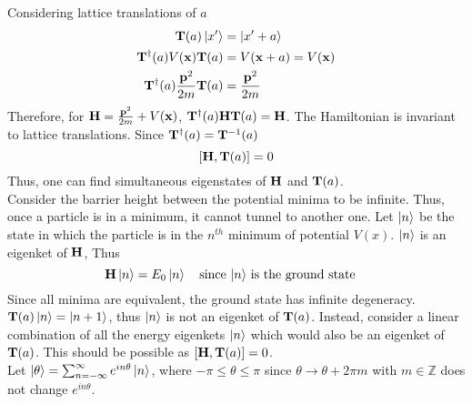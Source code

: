 \documentclass[12pt,a4paper,titlepage]{article}
\begin{document}
Considering lattice translations of $a$
\begin{equation}
\begin{aligned}
\vb{T}(a)\ket{x'}&=\ket{x'+a}\\
\vb{T}^{\dagger}(a)V(\vb{x})\vb{T}(a)&=V(\vb{x}+a)=V(\vb{x})\\
\vb{T}^{\dagger}(a)\frac{\vb{p}^{2}}{2m}\vb{T}(a)&=\frac{\vb{p}^{2}}{2m}
\end{aligned}
\end{equation}
Therefore, for $\vb{H}=\frac{\vb{p}^{2}}{2m}+V(\vb{x})$, $\vb{T}^{\dagger}(a)\vb{H}\vb{T}(a)=\vb{H}$. The Hamiltonian is invariant to lattice translations. Since $\vb{T}^{\dagger}(a)=\vb{T}^{-1}(a)$
\begin{equation}
\comm{\vb{H}}{\vb{T}(a)}=0
\end{equation}
Thus, one can find simultaneous eigenstates of $\vb{H}$ and $\vb{T}(a)$.\\

Consider the barrier height between the potential minima to be infinite. Thus, once a particle is in a minimum, it cannot tunnel to another one. Let $\ket{n}$ be the state in which the particle is in the $n^{th}$ minimum of potential $V(x)$. $\ket{n}$ is an eigenket of $\vb{H}$, Thus
\begin{equation}
\vb{H}\ket{n}=E_{0}\ket{n}\qq{since $\ket{n}$ is the ground state}
\end{equation}
Since all minima are equivalent, the ground state has infinite degeneracy.\\

$\vb{T}(a)\ket{n}=\ket{n+1}$, thus $\ket{n}$ is not an eigenket of $\vb{T}(a)$. Instead, consider a linear combination of all the energy eigenkets $\ket{n}$ which would also be an eigenket of $\vb{T}(a)$. This should be possible as $\comm{\vb{H}}{\vb{T}(a)}=0$.\\

Let $\ket{\theta}=\sum_{n=-\infty}^{\infty}e^{in\theta}\ket{n}$, where $-\pi\leq\theta\leq\pi$ since $\theta\rightarrow\theta+2\pi m$ with $m\in\mathbb{Z}$ does not change $e^{in\theta}$.
\end{document}
